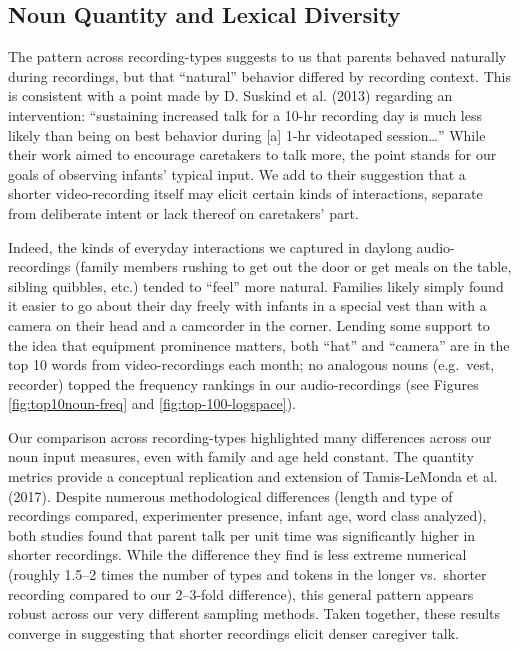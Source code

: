 \documentclass[floatsintext,man]{apa6}
\theoremstyle{definition}
\theoremstyle{definition}
\theoremstyle{definition}
\theoremstyle{remark}
\begin{document}
\hypertarget{noun-quantity-and-lexical-diversity}{%
\subsection{Noun Quantity and Lexical
Diversity}\label{noun-quantity-and-lexical-diversity}}

The pattern across recording-types suggests to us that parents behaved
naturally during recordings, but that \enquote{natural} behavior
differed by recording context. This is consistent with a point made by
D. Suskind et al. (2013) regarding an intervention: \enquote{sustaining
increased talk for a 10-hr recording day is much less likely than being
on best behavior during {[}a{]} 1-hr videotaped session\ldots{}} While
their work aimed to encourage caretakers to talk more, the point stands
for our goals of observing infants' typical input. We add to their
suggestion that a shorter video-recording itself may elicit certain
kinds of interactions, separate from deliberate intent or lack thereof
on caretakers' part.

Indeed, the kinds of everyday interactions we captured in daylong
audio-recordings (family members rushing to get out the door or get
meals on the table, sibling quibbles, etc.) tended to \enquote{feel}
more natural. Families likely simply found it easier to go about their
day freely with infants in a special vest than with a camera on their
head and a camcorder in the corner. Lending some support to the idea
that equipment prominence matters, both \enquote{hat} and
\enquote{camera} are in the top 10 words from video-recordings each
month; no analogous nouns (e.g.~vest, recorder) topped the frequency
rankings in our audio-recordings (see Figures \ref{fig:top10noun-freq}
and \ref{fig:top-100-logspace}).

Our comparison across recording-types highlighted many differences
across our noun input measures, even with family and age held constant.
The quantity metrics provide a conceptual replication and extension of
Tamis-LeMonda et al. (2017). Despite numerous methodological differences
(length and type of recordings compared, experimenter presence, infant
age, word class analyzed), both studies found that parent talk per unit
time was significantly higher in shorter recordings. While the
difference they find is less extreme numerical (roughly 1.5--2 times the
number of types and tokens in the longer vs.~shorter recording compared
to our 2--3-fold difference), this general pattern appears robust across
our very different sampling methods. Taken together, these results
converge in suggesting that shorter recordings elicit denser caregiver
talk.
\end{document}
